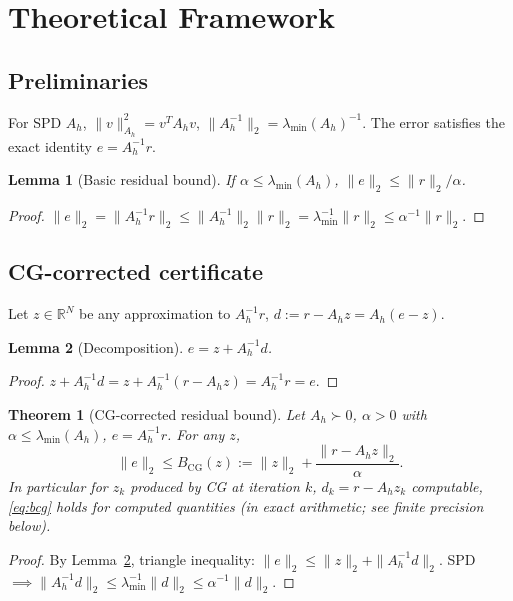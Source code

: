 \documentclass[conference]{IEEEtran}
\theoremstyle{plain}
\newtheorem{theorem}{Theorem}
\newtheorem{lemma}{Lemma}
\theoremstyle{definition}
\begin{document}
\section{Theoretical Framework}
\label{sec:theory}

\subsection{Preliminaries}
For SPD $A_h$, $\|v\|_{A_h}^2=v^T A_h v$, $\|A_h^{-1}\|_2=\lambda_{\min}(A_h)^{-1}$. The error satisfies the exact identity $e=A_h^{-1}r$.

\begin{lemma}[Basic residual bound]\label{lem:global}
If $\alpha\le\lambda_{\min}(A_h)$, $\|e\|_2 \le \|r\|_2/\alpha$.
\end{lemma}
\begin{proof}
$\|e\|_2=\|A_h^{-1}r\|_2\le \|A_h^{-1}\|_2\|r\|_2=\lambda_{\min}^{-1}\|r\|_2\le \alpha^{-1}\|r\|_2$.
\end{proof}

\subsection{CG-corrected certificate}
Let $z\in\mathbb{R}^N$ be any approximation to $A_h^{-1}r$, $d := r - A_h z = A_h(e-z)$.
\begin{lemma}[Decomposition]\label{lem:decomp}
$e = z + A_h^{-1}d$.
\end{lemma}
\begin{proof}
$z+A_h^{-1}d = z + A_h^{-1}(r-A_h z)=A_h^{-1}r=e$.
\end{proof}

\begin{theorem}[CG-corrected residual bound]\label{thm:cg}
Let $A_h\succ 0$, $\alpha>0$ with $\alpha\le\lambda_{\min}(A_h)$, $e=A_h^{-1}r$. For any $z$,
\begin{equation}
\|e\|_2 \le B_{\mathrm{CG}}(z) := \|z\|_2 + \frac{\|r - A_h z\|_2}{\alpha}.
\label{eq:bcg}
\end{equation}
In particular for $z_k$ produced by CG at iteration $k$, $d_k=r-A_h z_k$ computable, \eqref{eq:bcg} holds for computed quantities (in exact arithmetic; see finite precision below).
\end{theorem}
\begin{proof}
By Lemma~\ref{lem:decomp}, triangle inequality: $\|e\|_2 \le \|z\|_2 + \|A_h^{-1}d\|_2$. SPD $\implies \|A_h^{-1}d\|_2 \le \lambda_{\min}^{-1}\|d\|_2 \le \alpha^{-1}\|d\|_2$.
\end{proof}
\end{document}
